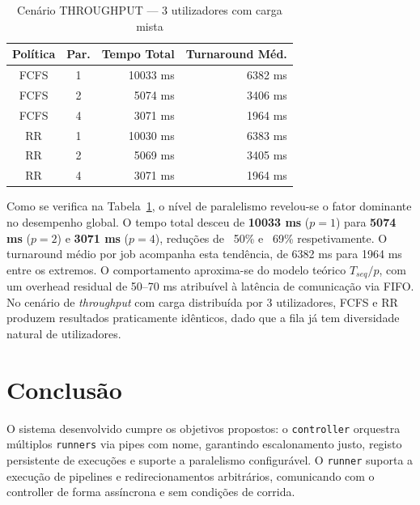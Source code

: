 \documentclass[runningheads,11pt]{llncs}
\begin{document}
                \begin{table}[H]
                \centering
                \begin{tabular}{|c|c|r|r|}
                \hline
                \textbf{Política} & \textbf{Par.} & \textbf{Tempo Total} & \textbf{Turnaround Méd.} \\
                \hline
                FCFS & 1 & 10033 ms & 6382 ms \\
                FCFS & 2 &  5074 ms & 3406 ms \\
                FCFS & 4 &  3071 ms & 1964 ms \\
                \hline
                RR   & 1 & 10030 ms & 6383 ms \\
                RR   & 2 &  5069 ms & 3405 ms \\
                RR   & 4 &  3071 ms & 1964 ms \\
                \hline
                \end{tabular}
                \vspace{1em}
                \caption{Cenário THROUGHPUT — 3 utilizadores com carga mista}
                \label{tab:throughput}
                \end{table}

                Como se verifica na Tabela~\ref{tab:throughput}, o nível de paralelismo revelou-se o fator
                dominante no desempenho global. O tempo total desceu de \textbf{10033 ms} ($p=1$) para
                \textbf{5074 ms} ($p=2$) e \textbf{3071 ms} ($p=4$), reduções de ~50\% e ~69\% respetivamente.
                O turnaround médio por job acompanha esta tendência, de 6382 ms para 1964 ms entre os extremos.
                O comportamento aproxima-se do modelo teórico $T_{seq} / p$, com um overhead residual de 50--70 ms
                atribuível à latência de comunicação via FIFO. No cenário de \textit{throughput} com carga
                distribuída por 3 utilizadores, FCFS e RR produzem resultados praticamente idênticos, dado que
                a fila já tem diversidade natural de utilizadores.

        \section{Conclusão}

                O sistema desenvolvido cumpre os objetivos propostos: o \texttt{controller} orquestra
                múltiplos \texttt{runners} via pipes com nome, garantindo escalonamento justo, registo 
                persistente de execuções e suporte a paralelismo configurável. O \texttt{runner} suporta 
                a execução de pipelines e redirecionamentos arbitrários, comunicando com o controller de 
                forma assíncrona e sem condições de corrida.
\end{document}
